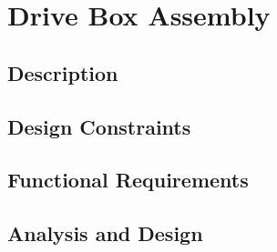 \section{Drive Box Assembly}
\subsection{Description}
\subsection{Design Constraints}
\subsection{Functional Requirements}
\subsection{Analysis and Design}